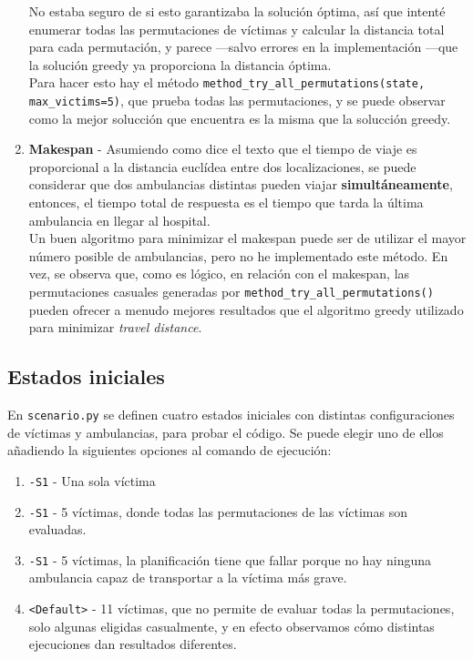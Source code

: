 \begin{enumerate}
   No estaba seguro de si esto garantizaba la solución óptima, así que intenté enumerar todas las permutaciones de víctimas y calcular la distancia total para cada permutación, y parece ---salvo errores en la implementación ---que la solución greedy ya proporciona la distancia óptima.\\
   Para hacer esto hay el método \lstinline|method_try_all_permutations(state, max_victims=5)|, que prueba todas las permutaciones, y se puede observar como la mejor solucción que encuentra es la misma que la solucción greedy.
   \item \textbf{Makespan} - Asumiendo como dice el texto que el tiempo de viaje es proporcional a la distancia euclídea entre dos localizaciones, se puede considerar que dos ambulancias distintas pueden viajar \textbf{simultáneamente}, entonces, el tiempo total de respuesta es el tiempo que tarda la última ambulancia en llegar al hospital.\\
   Un buen algoritmo para minimizar el makespan puede ser de utilizar el mayor número posible de ambulancias, pero no he implementado este método. En vez, se observa que, como es lógico, en relación con el makespan, las permutaciones casuales generadas por \lstinline|method_try_all_permutations()| pueden ofrecer a menudo mejores resultados que el algoritmo greedy utilizado para minimizar \textit{travel distance}.
\end{enumerate}

\subsection{Estados iniciales}

En \texttt{scenario.py} se definen cuatro estados iniciales con distintas configuraciones de víctimas y ambulancias, para probar el código. Se puede elegir uno de ellos añadiendo la siguientes opciones al comando de ejecución:
\begin{enumerate}
   \item \texttt{-S1} - Una sola víctima
   \item \texttt{-S1} - 5 víctimas, donde todas las permutaciones de las víctimas son evaluadas.
   \item \texttt{-S1} - 5 víctimas, la planificación tiene que fallar porque no hay ninguna ambulancia capaz de transportar a la víctima más grave.
   \item \texttt{<Default>} - 11 víctimas, que no permite de evaluar todas la permutaciones, solo algunas eligidas casualmente, y en efecto observamos cómo distintas ejecuciones dan resultados diferentes.
\end{enumerate}



